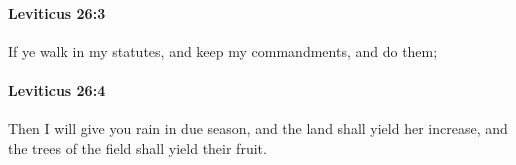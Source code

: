 		\paragraph{Leviticus 26:3} %
			\label{LEVITICUS-26-3}

			If ye walk in my statutes, and keep my commandments, and do them;


		\paragraph{Leviticus 26:4} %
			\label{LEVITICUS-26-4}

			Then I will give you rain in due season, and the land shall yield her increase, and the trees of the field shall yield their fruit.


